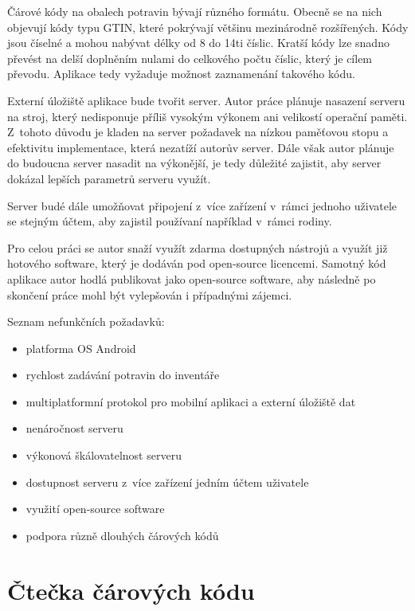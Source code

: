 \documentclass[thesis=B,czech]{FITthesis}[2013/10/20]
\begin{document}
Čárové kódy na obalech potravin bývají různého formátu. Obecně se na nich objevují kódy typu GTIN, které pokrývají většinu mezinárodně rozšířených. Kódy jsou číselné a mohou nabývat délky od 8 do 14ti číslic. Kratší kódy lze snadno převést na delší doplněním nulami do celkového počtu číslic, který je cílem převodu. Aplikace tedy vyžaduje možnost zaznamenání takového kódu.

Externí úložiště aplikace bude tvořit server. Autor práce plánuje nasazení serveru na stroj, který nedisponuje příliš vysokým výkonem ani velikostí operační paměti. Z~tohoto důvodu je kladen na server požadavek na nízkou paměťovou stopu a efektivitu implementace, která nezatíží autorův server. Dále však autor plánuje do budoucna server nasadit na výkonější, je tedy důležité zajistit, aby server dokázal lepších parametrů serveru využít.

Server budé dále umožňovat připojení z~více zařízení v~rámci jednoho uživatele se stejným účtem, aby zajistil používaní například v~rámci rodiny. 

Pro celou práci se autor snaží využít zdarma dostupných nástrojů a využít již hotového software, který je dodáván pod open-source licencemi. Samotný kód aplikace autor hodlá publikovat jako open-source software, aby následně po skončení práce mohl být vylepšován i případnými zájemci.

Seznam nefunkčních požadavků:

\begin{itemize}
  \item platforma OS Android
  \item rychlost zadávání potravin do inventáře
  \item multiplatformní protokol pro mobilní aplikaci a externí úložiště dat
  \item nenáročnost serveru
  \item výkonová škálovatelnost serveru
  \item dostupnost serveru z~více zařízení jedním účtem uživatele
  \item využití open-source software
  \item podpora různě dlouhých čárových kódů
\end{itemize}

\clearpage

\section{Čtečka čárových kódu}
\end{document}
